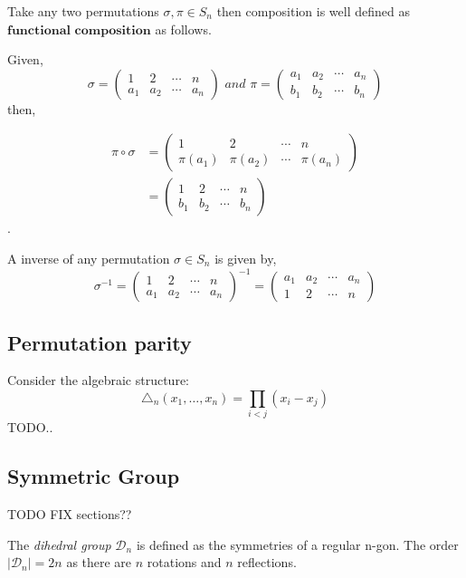 Take any two permutations $\sigma,\pi \in S_n$ then composition is well defined as $\textbf{functional composition}$
as follows.

Given,
\[
 \sigma =
 \begin{pmatrix}
  1 & 2 & \cdots & n \\
  a_1 & a_2 & \cdots & a_n
 \end{pmatrix}
 \, \, and \, \,
 \pi =
 \begin{pmatrix}
  a_1 & a_2 & \cdots & a_n \\
  b_1 & b_2 & \cdots & b_n
 \end{pmatrix}
\]
then,

\begin{align*}
 \pi \circ \sigma &=
 \begin{pmatrix}
  1 & 2 & \cdots & n \\
  \pi(a_1) & \pi(a_2) & \cdots & \pi(a_n)
 \end{pmatrix}
 \\
 &=
 \begin{pmatrix}
  1 & 2 & \cdots & n \\
  b_1 & b_2 & \cdots & b_n
 \end{pmatrix}
\end{align*}
.

A inverse of any permutation $\sigma \in S_n$ is given by,
\[
 \sigma^{-1} =
 \begin{pmatrix}
  1 & 2 & \cdots & n \\
  a_1 & a_2 & \cdots & a_n
 \end{pmatrix}^{-1}
 =
 \begin{pmatrix}
  a_1 & a_2 & \cdots & a_n \\
  1 & 2 & \cdots & n
 \end{pmatrix}
\]

\subsection{Permutation parity}
Consider the algebraic structure:
\[
	\triangle_n (x_1, \dots , x_n) = \prod_{i<j} (x_i - x_j)
\]
TODO..


\subsection{Symmetric Group}
TODO FIX sections??

\begin{defn}
	The \emph{dihedral group} $\mathcal{D}_n$ is defined as the symmetries of a regular n-gon.
	The order $| \mathcal{D}_n | = 2n$ as there are $n$ rotations and $n$ reflections.
\end{defn}

